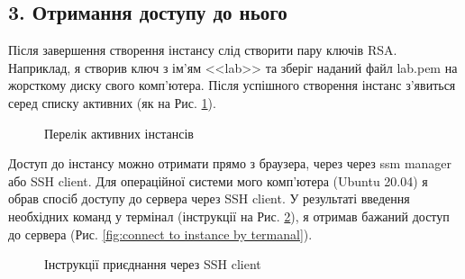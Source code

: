 \documentclass[a4paper,14pt]{extarticle}
\begin{document}
\subsection*{3. Отримання доступу до нього}

Після завершення створення інстансу слід створити пару 
ключів RSA. Наприклад, я створив ключ з ім'ям <<lab>> 
та зберіг наданий файл {\ttfamily lab.pem} на жорсткому 
диску свого комп'ютера. Після успішного створення інстанс 
з’явиться серед списку активних (як на Рис. \ref{fig:active instance}).

\begin{figure}[h]
    \caption{Перелік активних інстансів}
    \label{fig:active instance}
\end{figure}

Доступ до інстансу можно отримати прямо з браузера, 
через через ssm manager або SSH client. Для операційної 
системи мого комп'ютера (Ubuntu 20.04) я обрав спосіб 
доступу до сервера через SSH client. У результаті введення 
необхідних команд у термінал (інструкції на Рис. 
\ref{fig:connect to instance}), я отримав бажаний доступ 
до сервера (Рис. \ref{fig:connect to instance by termanal}).

\begin{figure}[h]
    \caption{Інструкції приєднання через SSH client}
    \label{fig:connect to instance}
\end{figure}
\end{document}
